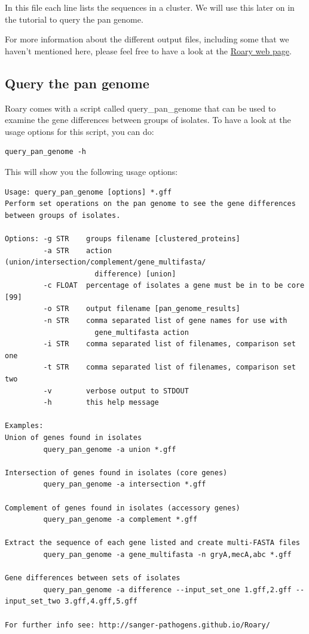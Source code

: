 \documentclass[11pt]{article}
\begin{document}
In this file each line lists the sequences in a cluster. We will use
this later on in the tutorial to query the pan genome.

    For more information about the different output files, including some
that we haven't mentioned here, please feel free to have a look at the
\href{https://sanger-pathogens.github.io/Roary/}{Roary web page}.

    \hypertarget{query-the-pan-genome}{%
\subsection{Query the pan genome}\label{query-the-pan-genome}}

Roary comes with a script called query\_pan\_genome that can be used to
examine the gene differences between groups of isolates. To have a look
at the usage options for this script, you can do:

\begin{verbatim}
query_pan_genome -h
\end{verbatim}

This will show you the following usage options:

\begin{verbatim}
Usage: query_pan_genome [options] *.gff
Perform set operations on the pan genome to see the gene differences
between groups of isolates.

Options: -g STR    groups filename [clustered_proteins]
         -a STR    action (union/intersection/complement/gene_multifasta/
                     difference) [union]
         -c FLOAT  percentage of isolates a gene must be in to be core [99]
         -o STR    output filename [pan_genome_results]
         -n STR    comma separated list of gene names for use with
                     gene_multifasta action
         -i STR    comma separated list of filenames, comparison set one
         -t STR    comma separated list of filenames, comparison set two
         -v        verbose output to STDOUT
         -h        this help message

Examples:
Union of genes found in isolates
         query_pan_genome -a union *.gff

Intersection of genes found in isolates (core genes)
         query_pan_genome -a intersection *.gff

Complement of genes found in isolates (accessory genes)
         query_pan_genome -a complement *.gff

Extract the sequence of each gene listed and create multi-FASTA files
         query_pan_genome -a gene_multifasta -n gryA,mecA,abc *.gff

Gene differences between sets of isolates
         query_pan_genome -a difference --input_set_one 1.gff,2.gff --input_set_two 3.gff,4.gff,5.gff

For further info see: http://sanger-pathogens.github.io/Roary/
\end{verbatim}
\end{document}
